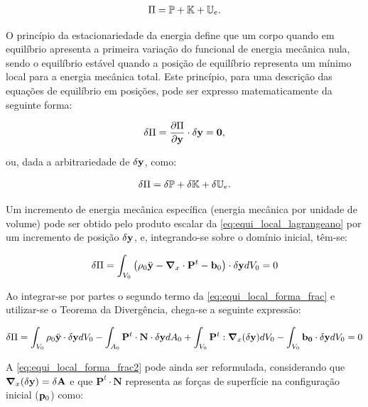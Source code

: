 \begin{align}
	\Pi = \mathbb{P} + \mathbb{K} + \mathbb{U}_e.
\end{align}

O princípio da estacionariedade da energia define que um corpo quando em equilíbrio apresenta a primeira variação do funcional de energia mecânica nula, sendo o equilíbrio estável quando a posição de equilíbrio representa um mínimo local para a energia mecânica total. Este princípio, para uma descrição das equações de equilíbrio em posições, pode ser expresso matematicamente da seguinte forma:

\begin{align}
	\delta\Pi = \frac{\partial{\Pi}}{\partial{\mathbf{y}}} \cdot \delta\mathbf{y} = \mathbf{0}, \label{eq:princ_esta}
\end{align}

\noindent ou, dada a arbitrariedade de $\delta\mathbf{y}$, como: 

\begin{align}
	\delta\Pi = \delta\mathbb{P} + \delta\mathbb{K} + \delta\mathbb{U}_e.
\end{align}

Um incremento de energia mecânica específica (energia mecânica por unidade de volume) pode ser obtido pelo produto escalar da \autoref{eq:equi_local_lagrangeano} por um incremento de posição $\delta\mathbf{y}$, e, integrando-se sobre o domínio inicial, têm-se:

\begin{align}
	\delta\Pi = \int_{V_0} \left(\rho_0 \ddot{\mathbf{y}} - \boldsymbol{\nabla}_x \cdot \mathbf{P}^t -  \mathbf{b}_0 \right) \cdot  \delta\mathbf{y} dV_0 = 0 \label{eq:equi_local_forma_frac}
\end{align}

Ao integrar-se por partes o segundo termo da \autoref{eq:equi_local_forma_frac} e utilizar-se o Teorema da Divergência, chega-se a seguinte expressão:

\begin{align}
	\delta\Pi = \int_{V_0} \rho_0 \ddot{\mathbf{y}} \cdot \delta\mathbf{y} dV_0 - \int_{A_0} \mathbf{P}^t \cdot \mathbf{N} \cdot  \delta\mathbf{y} dA_0  + \int_{V_0} \mathbf{P}^t : \boldsymbol{\nabla}_x(\delta\mathbf{y}) dV_0 - \int_{V_0} \mathbf{b_0} \cdot \delta \mathbf{y} dV_0 = 0 \label{eq:equi_local_forma_frac2}
\end{align}

A \autoref {eq:equi_local_forma_frac2} pode ainda ser reformulada, considerando que $\boldsymbol{\nabla}_x (\delta\mathbf{y}) = \delta \mathbf{A}$ e que $\mathbf{P}^t \cdot \mathbf{N}$ representa as forças de superfície na configuração inicial ($\mathbf{p}_{0}$) como:

